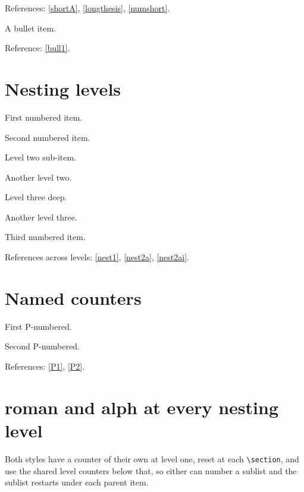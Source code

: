 \documentclass[leqno]{article}
\begin{document}
References: \ref{shortA}, \ref{longthesis}, \ref{numshort}.

\begin{prop}
  \item[style=bullet] A bullet item. \label{bull1}
\end{prop}

Reference: \ref{bull1}.

\section{Nesting levels}

\begin{prop}
  \item First numbered item. \label{nest1}
  \item Second numbered item. \label{nest2}
  \begin{prop}
    \item Level two sub-item. \label{nest2a}
    \item Another level two. \label{nest2b}
    \begin{prop}
      \item Level three deep. \label{nest2ai}
      \item Another level three. \label{nest2aii}
    \end{prop}
  \end{prop}
  \item Third numbered item. \label{nest3}
\end{prop}

References across levels: \ref{nest1}, \ref{nest2a}, \ref{nest2ai}.

\section{Named counters}

\begin{prop}
  \item[counter=P] First P-numbered. \label{P1}
  \item[counter=P] Second P-numbered. \label{P2}
\end{prop}

References: \ref{P1}, \ref{P2}.

\section{roman and alph at every nesting level}

Both styles have a counter of their own at level one, reset at each
\verb|\section|, and use the shared level counters below that, so either can
number a sublist and the sublist restarts under each parent item.
\end{document}
